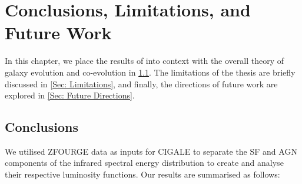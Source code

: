 \chapter{Conclusions, Limitations, and Future Work} \label{Sec: Concluding Chapter}

In this chapter, we place the results of  into context with the overall theory of galaxy evolution and co-evolution in \cref{Sec: Conclusion Conclusions}. The limitations of the thesis are briefly discussed in \cref{Sec: Limitations}, and finally, the directions of future work are explored in \cref{Sec: Future Directions}.

\section{Conclusions} \label{Sec: Conclusion Conclusions}

We utilised ZFOURGE data as inputs for CIGALE to separate the SF and AGN components of the infrared spectral energy distribution to create and analyse their respective luminosity functions. Our results are summarised as follows:

